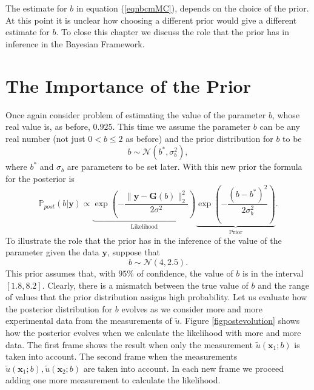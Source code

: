 \documentclass[12pt]{book}
\newcommand{\post}{\mathbb{P}_{post}}
\newcommand{\x}{\textbf{x}}
\begin{document}
The estimate for $b$ in equation (\ref{eqnbcmMC}), depends on the choice of the prior. At this point it is unclear
how choosing a different prior would give a different estimate for $b$.
To close this chapter we discuss  the role that the prior has in inference in the Bayesian Framework.
\section{The Importance of the Prior}
Once again  consider  problem of estimating
the value of the parameter $b$, whose real value is, as before, $0.925$. This time we assume the parameter
$b$ can be any real number (not just $0<b\leq 2$ as before) and the  prior distribution for $b$ to be
\begin{equation*}
b\sim\mathscr{N}(b^{*},\sigma_{b}^{2}),
\end{equation*}
where $b^{*}$ and $\sigma_{b}$ are parameters to be set later.  With this new prior the formula
for the posterior is 
\begin{equation*}
\post(b|\textbf{y})\propto\underbrace{\exp\left(-\frac{\|\textbf{y}-\textbf{G}(b)\|_{2}^{2}}{2\sigma^{2}}\right)}_{\text{Likelihood}}\underbrace{\exp\left(-\frac{(b-b^{*})^{2}}{2\sigma_{b}^{2}}\right)}_{\text{Prior}}.
\end{equation*}
To illustrate the role that the prior has in the inference of the value
of the parameter given the data $\textbf{y}$, suppose that 
\begin{equation*}
b\sim\mathscr{N}(4,2.5).
\end{equation*}
This prior assumes that, with $95\%$ of confidence, the value of
$b$ is in the interval $[1.8,8.2]$. Clearly, there is a mismatch between
the true value of $b$ and the range of values that the prior distribution
assigns high probability. Let us evaluate how the posterior
distribution for $b$ evolves as we consider more and more experimental
data from the measurements of $\tilde{u}$. Figure \ref{figpostevolution} shows
how the posterior evolves when we calculate the likelihood with more 
and more data. The first frame shows the result when only the measurement
$\tilde{u}(\x_{1};b)$ is taken into account. The second frame
when the measurements $\tilde{u}(\x_{1};b),\tilde{u}(\x_{2};b)$ are taken
into account. In each new frame we proceed adding one more measurement 
to calculate the likelihood.
\end{document}
